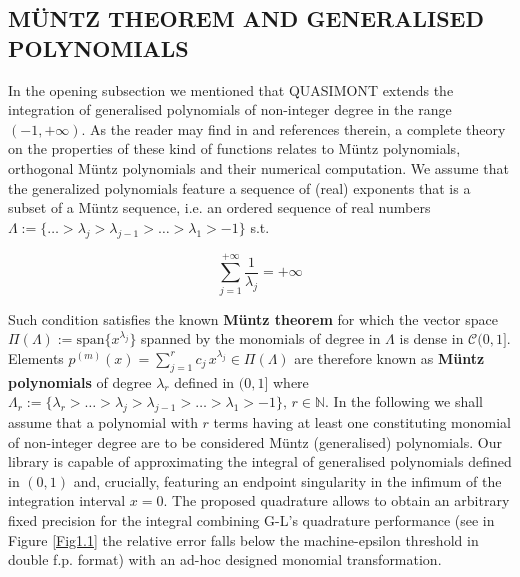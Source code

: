 \documentclass[a4paper, twosided]{book}
\begin{document}
\subsection[Müntz theorem and generalised polynomials]{\changefont MÜNTZ THEOREM AND GENERALISED POLYNOMIALS }\label{SubSec1.2.4}

In the opening subsection we mentioned that QUASIMONT extends the integration of generalised polynomials of non-integer degree in the range $(-1,+\infty)$. As the reader may find in \cite{Lombardi09} and references therein, a complete theory on the properties of these kind of functions relates to Müntz polynomials, orthogonal Müntz polynomials and their numerical computation. We assume that the generalized polynomials feature a sequence of (real) exponents that is a subset of a Müntz sequence, i.e. an ordered sequence of real numbers $\Lambda:=\{\dots>\lambda_j>\lambda_{j-1}>\dots>\lambda_1>-1\}$ s.t.

\begin{equation}\label{eq1.10}
    \sum_{j=1}^{+\infty}\frac{1}{\lambda_j}=+\infty
\end{equation}

\noindent
Such condition satisfies the known \color{poliDarkBlue} \textbf{Müntz theorem} \color{black} for which the vector space $\Pi(\Lambda):=\text{span}\{x^{\lambda_j}\}$ spanned by the monomials of degree in $\Lambda$ is dense in $\mathcal{C}(0,1]$. Elements $p^{(m)}(x) = \sum_{j=1}^{r} c_j\,x^{\lambda_j}\in\Pi(\Lambda)$ are therefore known as \color{poliDarkBlue} \textbf{Müntz polynomials} \color{black} of degree $\lambda_r$ defined in $(0,1]$ where  $\Lambda_r:=\{\lambda_r>\dots>\lambda_j>\lambda_{j-1}>\dots>\lambda_1>-1\},\, r\in\mathbb{N}$. In the following we shall assume that a polynomial with $r$ terms having at least one constituting monomial of non-integer degree are to be considered Müntz (generalised) polynomials. Our library is capable of approximating the integral of generalised polynomials defined in $(0,1)$ and, crucially, featuring an endpoint singularity in the infimum of the integration interval $x=0$. The proposed quadrature allows to obtain an arbitrary fixed precision for the integral combining G-L's quadrature performance (see in Figure \ref{Fig1.1} the relative error falls below the machine-epsilon threshold in double f.p. format) with an ad-hoc designed monomial transformation.
\end{document}
